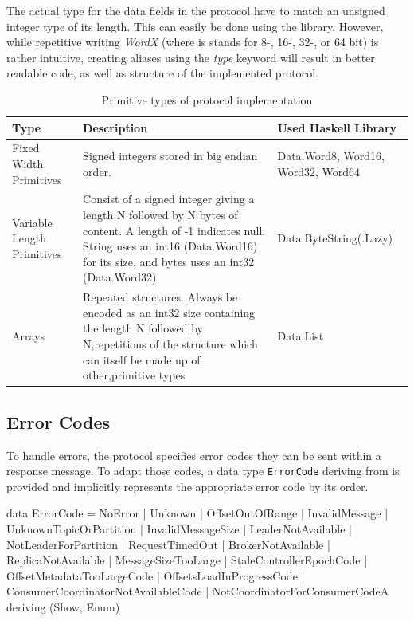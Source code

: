 The actual type for the data fields in the protocol have to match an unsigned
integer type of its length. This can easily be done using the
library. However, while repetitive writing \textit{WordX} (where is stands for
8-, 16-, 32-, or 64 bit) is rather intuitive, creating aliases using the
\textit{type} keyword will result in better readable code, as well as structure
of the implemented protocol. 

\begin{table}[H]
    \begin{tabular}{| p{3cm}| p{7cm} | p{5cm} |}
\hline
\textbf{Type} & \textbf{Description} & \textbf{Used Haskell Library} \\ \hline
Fixed Width Primitives     & Signed integers stored in big endian order.
& Data.Word8, Word16, Word32, Word64 \\ \hline
Variable Length Primitives & Consist of a signed integer giving a length N
followed by N bytes of content. A length of -1 indicates null. String uses an
int16 (Data.Word16) for its size, and bytes uses an int32 (Data.Word32).    &
Data.ByteString(.Lazy) \\ \hline
Arrays                     & Repeated structures. Always be encoded as an int32
size containing the length N followed by N,repetitions of the structure which
can itself be made up of other,primitive types & Data.List                          \\ \hline
\end{tabular}
 \caption{Primitive types of protocol implementation}
\end{table}

\subsection{Error Codes}
\label{subsec:protocol-types-error-codes}

To handle errors, the protocol specifies error codes they can be sent within a
response message. To adapt those codes, a data type \lstinline{ErrorCode}
deriving from
 is provided and implicitly represents the
appropriate error code by its order.

\begin{code}
data ErrorCode =
        NoError
      | Unknown
      | OffsetOutOfRange
      | InvalidMessage
      | UnknownTopicOrPartition
      | InvalidMessageSize
      | LeaderNotAvailable
      | NotLeaderForPartition
      | RequestTimedOut
      | BrokerNotAvailable
      | ReplicaNotAvailable
      | MessageSizeTooLarge
      | StaleControllerEpochCode
      | OffsetMetadataTooLargeCode
      | OffsetsLoadInProgressCode
      | ConsumerCoordinatorNotAvailableCode
      | NotCoordinatorForConsumerCodeA
        deriving (Show, Enum)
\end{code}


